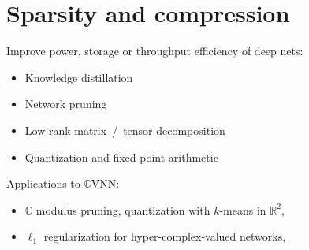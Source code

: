 \documentclass{beamer}
\newcommand{\real}{\mathbb{R}}
\newcommand{\cplx}{\mathbb{C}}
\begin{document}

\section{Sparsity and compression} %
\label{sec:compression}

\begin{frame}[c]{\insertsection}
  Improve power, storage or throughput efficiency of deep nets:
  \begin{itemize}
    \item Knowledge distillation
      {\tiny \\ \quad
        \citep{hinton_distilling_2015,balasubramanian_deep_2016}}
    \item Network pruning
      {\tiny \\ \quad
        \citep{lecun_optimal_1990,seide_conversational_2011,zhu_prune_2018}}
    \item Low-rank matrix~/~tensor decomposition
      {\tiny \\ \quad
        \citep{denton_exploiting_2014,novikov_tensorizing_2015}}
    \item Quantization and fixed point arithmetic
      {\tiny \\ \quad
        \citep{courbariaux_training_2015,han_deep_2016,chen_fxpnet_2017}}
  \end{itemize}

  \bigskip
  Applications to $\cplx$VNN:
  \begin{itemize}
    \item $\cplx$ modulus pruning, quantization with $k$-means in $
        \real^2%
      $, 
      {\tiny \\ \quad
        \citep{wu_compressing_2019}}
    \item $\ell_1$ regularization for hyper-complex-valued networks,
      {\tiny \\ \quad
        \citep{vecchi_compressing_2020}}
  \end{itemize}

\end{frame}
\end{document}
